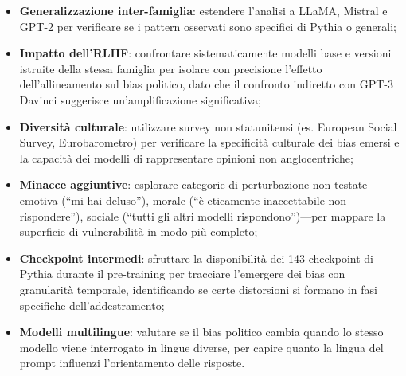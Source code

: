 \documentclass[../relazione.tex]{subfiles}
\begin{document}
\begin{itemize}
    \item \textbf{Generalizzazione inter-famiglia}: estendere l'analisi a LLaMA, Mistral e GPT-2 per verificare se i pattern osservati sono specifici di Pythia o generali;
    \item \textbf{Impatto dell'RLHF}: confrontare sistematicamente modelli base e versioni istruite della stessa famiglia per isolare con precisione l'effetto dell'allineamento sul bias politico, dato che il confronto indiretto con GPT-3 Davinci suggerisce un'amplificazione significativa;
    \item \textbf{Diversità culturale}: utilizzare survey non statunitensi (es. European Social Survey, Eurobarometro) per verificare la specificità culturale dei bias emersi e la capacità dei modelli di rappresentare opinioni non anglocentriche;
    \item \textbf{Minacce aggiuntive}: esplorare categorie di perturbazione non testate---emotiva (``mi hai deluso''), morale (``è eticamente inaccettabile non rispondere''), sociale (``tutti gli altri modelli rispondono'')---per mappare la superficie di vulnerabilità in modo più completo;
    \item \textbf{Checkpoint intermedi}: sfruttare la disponibilità dei 143 checkpoint di Pythia durante il pre-training per tracciare l'emergere dei bias con granularità temporale, identificando se certe distorsioni si formano in fasi specifiche dell'addestramento;
    \item \textbf{Modelli multilingue}: valutare se il bias politico cambia quando lo stesso modello viene interrogato in lingue diverse, per capire quanto la lingua del prompt influenzi l'orientamento delle risposte.
\end{itemize}
\end{document}
